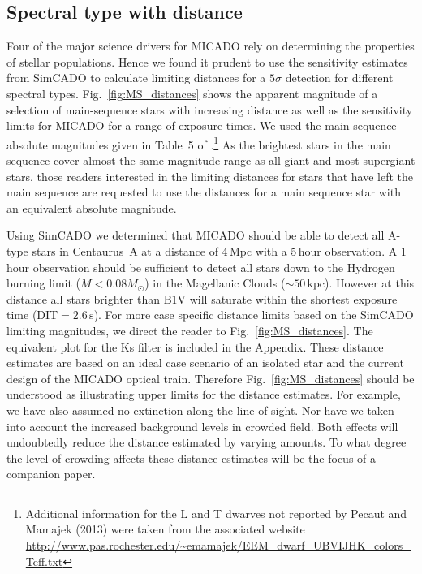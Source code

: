 \subsection{Spectral type with distance}


Four of the major science drivers for MICADO rely on determining the properties of stellar populations. Hence we found it prudent to use the sensitivity estimates from SimCADO to calculate limiting distances for a $5\sigma$ detection for different spectral types. Fig.~\ref{fig:MS_distances} shows the apparent magnitude of a selection of main-sequence stars with increasing distance as well as the sensitivity limits for MICADO for a range of exposure times. 
We used the main sequence absolute magnitudes given in Table~5 of \citet{pecaut2013}.\footnote{Additional information for the L and T dwarves not reported by Pecaut and Mamajek (2013) were taken from the associated website \url{http://www.pas.rochester.edu/~emamajek/EEM_dwarf_UBVIJHK_colors_Teff.txt}} As the brightest stars in the main sequence cover almost the same magnitude range as all giant and most supergiant stars, those readers interested in the limiting distances for stars that have left the main sequence are requested to use the distances for a main sequence star with an equivalent absolute magnitude. 

Using SimCADO we determined that MICADO should be able to detect all A-type stars in Centaurus~A at a distance of 4\,Mpc with a 5\,hour observation. A 1\,hour observation should be sufficient to detect all stars down to the Hydrogen burning limit ($M < 0.08 M_{\odot}$) in the Magellanic Clouds ($\sim 50\,\mathrm{kpc}$). However at this distance all stars brighter than B1V will saturate within the shortest exposure time ($\mathrm{DIT} =2.6\,\mathrm{s}$). For more case specific distance limits based on the SimCADO limiting magnitudes, we direct the reader to Fig.~\ref{fig:MS_distances}. The equivalent plot for the Ks filter is included in the Appendix. These distance estimates are based on an ideal case scenario of an isolated star and the current design of the MICADO optical train. Therefore Fig.~\ref{fig:MS_distances} should be understood as illustrating upper limits for the distance estimates. For example, we have also assumed no extinction along the line of sight. Nor have we taken into account the increased background levels in crowded field. Both effects will undoubtedly reduce the distance estimated by varying amounts. To what degree the level of crowding affects these distance estimates will be the focus of a companion paper.


